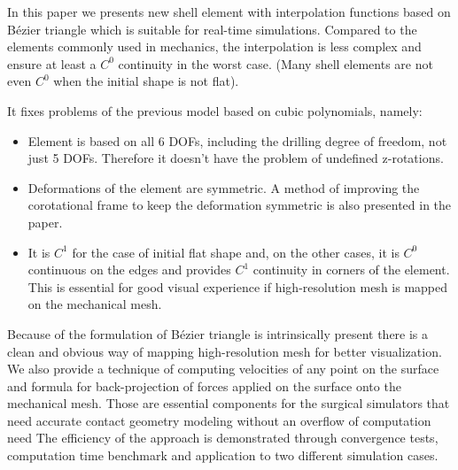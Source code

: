 \documentclass{egpubl}
\begin{document}
In this paper we presents new shell element with interpolation functions
based on B\'ezier triangle which is  suitable for real-time simulations.
Compared to  the elements commonly used in mechanics, the interpolation is less complex and ensure at least a $C^0$ continuity in the worst case. 
(Many shell elements are not even $C^0$ when the initial shape is not flat).

It fixes problems of the previous model \cite{Comas2010c} based on cubic polynomials, namely:

\begin{itemize}

    \item Element is based on all 6 DOFs, including the drilling degree of
        freedom, not just 5 DOFs. Therefore it doesn't have the problem of
        undefined z-rotations.

    \item Deformations of the element are symmetric. A method of improving
    the corotational frame to keep the deformation symmetric is also
    presented in the paper.

    \item It is $C^1$ for the case of initial flat shape and, on the other cases, it is $C^0$ continuous on the edges and provides $C^1$ continuity in
    corners of the element. This is essential for good visual experience if
    high-resolution mesh is mapped on the mechanical mesh.

\end{itemize}

Because of the formulation of B\'ezier triangle is intrinsically present
there is a clean and obvious way of mapping high-resolution mesh for better
visualization. We also provide a technique of computing velocities of any point
on the surface and formula for back-projection of forces applied on the
surface onto the mechanical mesh. 
Those are essential components for the surgical simulators that need accurate contact geometry modeling without an overflow of computation need
The efficiency of the approach is demonstrated through convergence tests,  computation time benchmark and application to two different  simulation cases.



%



\end{document}

